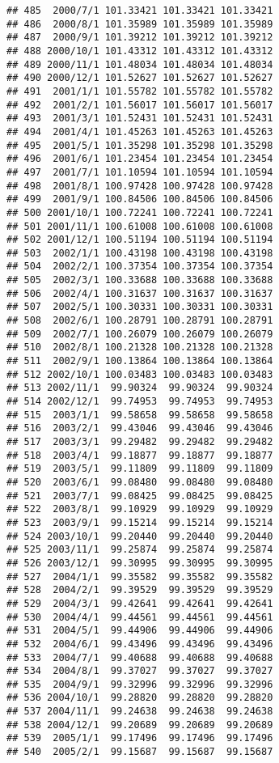 \documentclass[
]{article}
\begin{document}
\begin{verbatim}
## 485  2000/7/1 101.33421 101.33421 101.33421
## 486  2000/8/1 101.35989 101.35989 101.35989
## 487  2000/9/1 101.39212 101.39212 101.39212
## 488 2000/10/1 101.43312 101.43312 101.43312
## 489 2000/11/1 101.48034 101.48034 101.48034
## 490 2000/12/1 101.52627 101.52627 101.52627
## 491  2001/1/1 101.55782 101.55782 101.55782
## 492  2001/2/1 101.56017 101.56017 101.56017
## 493  2001/3/1 101.52431 101.52431 101.52431
## 494  2001/4/1 101.45263 101.45263 101.45263
## 495  2001/5/1 101.35298 101.35298 101.35298
## 496  2001/6/1 101.23454 101.23454 101.23454
## 497  2001/7/1 101.10594 101.10594 101.10594
## 498  2001/8/1 100.97428 100.97428 100.97428
## 499  2001/9/1 100.84506 100.84506 100.84506
## 500 2001/10/1 100.72241 100.72241 100.72241
## 501 2001/11/1 100.61008 100.61008 100.61008
## 502 2001/12/1 100.51194 100.51194 100.51194
## 503  2002/1/1 100.43198 100.43198 100.43198
## 504  2002/2/1 100.37354 100.37354 100.37354
## 505  2002/3/1 100.33688 100.33688 100.33688
## 506  2002/4/1 100.31637 100.31637 100.31637
## 507  2002/5/1 100.30331 100.30331 100.30331
## 508  2002/6/1 100.28791 100.28791 100.28791
## 509  2002/7/1 100.26079 100.26079 100.26079
## 510  2002/8/1 100.21328 100.21328 100.21328
## 511  2002/9/1 100.13864 100.13864 100.13864
## 512 2002/10/1 100.03483 100.03483 100.03483
## 513 2002/11/1  99.90324  99.90324  99.90324
## 514 2002/12/1  99.74953  99.74953  99.74953
## 515  2003/1/1  99.58658  99.58658  99.58658
## 516  2003/2/1  99.43046  99.43046  99.43046
## 517  2003/3/1  99.29482  99.29482  99.29482
## 518  2003/4/1  99.18877  99.18877  99.18877
## 519  2003/5/1  99.11809  99.11809  99.11809
## 520  2003/6/1  99.08480  99.08480  99.08480
## 521  2003/7/1  99.08425  99.08425  99.08425
## 522  2003/8/1  99.10929  99.10929  99.10929
## 523  2003/9/1  99.15214  99.15214  99.15214
## 524 2003/10/1  99.20440  99.20440  99.20440
## 525 2003/11/1  99.25874  99.25874  99.25874
## 526 2003/12/1  99.30995  99.30995  99.30995
## 527  2004/1/1  99.35582  99.35582  99.35582
## 528  2004/2/1  99.39529  99.39529  99.39529
## 529  2004/3/1  99.42641  99.42641  99.42641
## 530  2004/4/1  99.44561  99.44561  99.44561
## 531  2004/5/1  99.44906  99.44906  99.44906
## 532  2004/6/1  99.43496  99.43496  99.43496
## 533  2004/7/1  99.40688  99.40688  99.40688
## 534  2004/8/1  99.37027  99.37027  99.37027
## 535  2004/9/1  99.32996  99.32996  99.32996
## 536 2004/10/1  99.28820  99.28820  99.28820
## 537 2004/11/1  99.24638  99.24638  99.24638
## 538 2004/12/1  99.20689  99.20689  99.20689
## 539  2005/1/1  99.17496  99.17496  99.17496
## 540  2005/2/1  99.15687  99.15687  99.15687

\end{verbatim}
\end{document}
